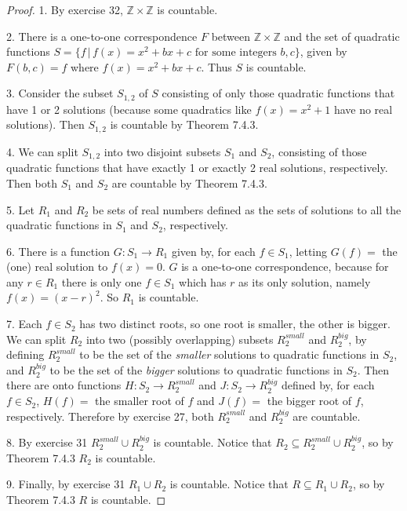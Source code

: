 \documentclass[14pt]{extarticle}
\newcommand{\Z}{\mathbb{Z}}
\begin{document}
\begin{proof}
    1. By exercise 32, \(\Z \times \Z\) is countable.

    2. There is a one-to-one correspondence $F$ between \(\Z \times \Z\) and the set of quadratic functions \(S = \{f \,
    | \, f(x) = x^2 + bx + c \text{ for some integers } b,c\}\), given by \(F(b,c) = f\) where \(f(x) = x^2 + bx + c\).
    Thus $S$ is countable.

    3. Consider the subset $S_{1,2}$ of $S$ consisting of only those quadratic functions that have 1 or 2 solutions
    (because some quadratics like \(f(x) = x^2+1\) have no real solutions). Then $S_{1,2}$ is countable by Theorem 7.4.3.

    4. We can split $S_{1,2}$ into two disjoint subsets $S_1$ and $S_2$, consisting of those quadratic functions that
    have exactly 1 or exactly 2 real solutions, respectively. Then both $S_1$ and $S_2$ are countable by Theorem 7.4.3.

    5. Let $R_1$ and $R_2$ be sets of real numbers defined as the sets of solutions to all the quadratic functions in
    $S_1$ and $S_2$, respectively.

    6. There is a function \(G: S_1 \to R_1\) given by, for each \(f \in S_1\), letting \(G(f) = \) the (one) real
    solution to $f(x) = 0$. $G$ is a one-to-one correspondence, because for any $r \in R_1$ there is only one $f \in S_1$
    which has $r$ as its only solution, namely \(f(x) = (x-r)^2\). So $R_1$ is countable.

    7. Each $f \in S_2$ has two distinct roots, so one root is smaller, the other is bigger. We can split $R_2$ into two
    (possibly overlapping) subsets \(R_2^{small}\) and \(R_2^{big}\), by defining \(R_2^{small}\) to be the set of
    the {\it smaller} solutions to quadratic functions in $S_2$, and \(R_2^{big}\) to be the set of the {\it bigger}
    solutions to quadratic functions in $S_2$. Then there are onto functions \(H: S_2 \to R_2^{small}\) and \(J: S_2 \to
    R_2^{big}\) defined by, for each $f \in S_2$, \(H(f) = \) the smaller root of $f$ and \(J(f) = \) the bigger root of
    $f$, respectively. Therefore by exercise 27, both \(R_2^{small}\) and \(R_2^{big}\) are countable.

    8. By exercise 31 \(R_2^{small} \cup R_2^{big}\) is countable. Notice that \(R_2 \subseteq R_2^{small} \cup
    R_2^{big}\), so by Theorem 7.4.3 \(R_2\) is countable.

    9. Finally, by exercise 31 \(R_1 \cup R_2\) is countable. Notice that \(R \subseteq R_1 \cup R_2\), so by Theorem
    7.4.3 \(R\) is countable.
\end{proof}
\end{document}
